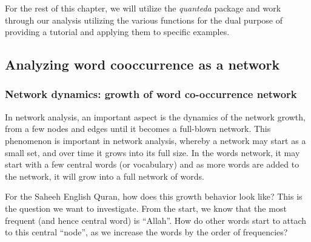\documentclass[
]{article}
\begin{document}
\normalsize

For the rest of this chapter, we will utilize the \emph{quanteda} package and work through our analysis utilizing the various functions for the dual purpose of providing a tutorial and applying them to specific examples.

\hypertarget{analyzing-word-cooccurrences-as-a-network}{%
\subsection{Analyzing word cooccurrence as a network}\label{analyzing-word-cooccurrences-as-a-network}}

\hypertarget{network-dynamics-growth-of-word-co-occurrence-network}{%
\subsubsection{Network dynamics: growth of word co-occurrence network}\label{network-dynamics-growth-of-word-co-occurrence-network}}

In network analysis, an important aspect is the dynamics of the network growth, from a few nodes and edges until it becomes a full-blown network. This phenomenon is important in network analysis, whereby a network may start as a small set, and over time it grows into its full size. In the words network, it may start with a few central words (or vocabulary) and as more words are added to the network, it will grow into a full network of words.

For the Saheeh English Quran, how does this growth behavior look like? This is the question we want to investigate. From the start, we know that the most frequent (and hence central word) is ``Allah''. How do other words start to attach to this central ``node'', as we increase the words by the order of frequencies?
\end{document}
